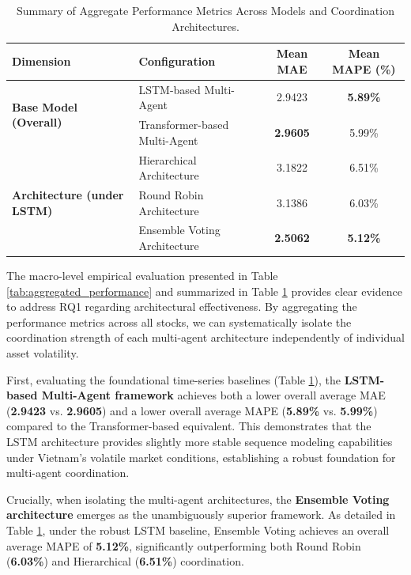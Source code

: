\documentclass{ieeeaccess}
\begin{document}
\begin{table}[t]
\centering
\caption{Summary of Aggregate Performance Metrics Across Models and Coordination Architectures.}
\label{tab:aggregate_performance_summary}
\begin{tabular*}{\textwidth}{@{\extracolsep{\fill}}llcc@{}}
\toprule
\textbf{Dimension} & \textbf{Configuration} & \textbf{Mean MAE} & \textbf{Mean MAPE (\%)} \\ \midrule
\multirow{2}{*}{\textbf{Base Model (Overall)}} & LSTM-based Multi-Agent & 2.9423 & \textbf{5.89\%} \\
                                             & Transformer-based Multi-Agent & \textbf{2.9605} & 5.99\% \\ \midrule
\multirow{3}{*}{\textbf{Architecture (under LSTM)}} & Hierarchical Architecture & 3.1822 & 6.51\% \\
                                                      & Round Robin Architecture & 3.1386 & 6.03\% \\
                                                      & Ensemble Voting Architecture & \textbf{2.5062} & \textbf{5.12\%} \\ \bottomrule
\end{tabular*}
\end{table}

The macro-level empirical evaluation presented in Table \ref{tab:aggregated_performance} and summarized in Table \ref{tab:aggregate_performance_summary} provides clear evidence to address RQ1 regarding architectural effectiveness. By aggregating the performance metrics across all stocks, we can systematically isolate the coordination strength of each multi-agent architecture independently of individual asset volatility.

First, evaluating the foundational time-series baselines (Table \ref{tab:aggregate_performance_summary}), the \textbf{LSTM-based Multi-Agent framework} achieves both a lower overall average MAE (\textbf{2.9423} vs. \textbf{2.9605}) and a lower overall average MAPE (\textbf{5.89\%} vs. \textbf{5.99\%}) compared to the Transformer-based equivalent. This demonstrates that the LSTM architecture provides slightly more stable sequence modeling capabilities under Vietnam's volatile market conditions, establishing a robust foundation for multi-agent coordination.

Crucially, when isolating the multi-agent architectures, the \textbf{Ensemble Voting architecture} emerges as the unambiguously superior framework. As detailed in Table \ref{tab:aggregate_performance_summary}, under the robust LSTM baseline, Ensemble Voting achieves an overall average MAPE of \textbf{5.12\%}, significantly outperforming both Round Robin (\textbf{6.03\%}) and Hierarchical (\textbf{6.51\%}) coordination.
\end{document}
